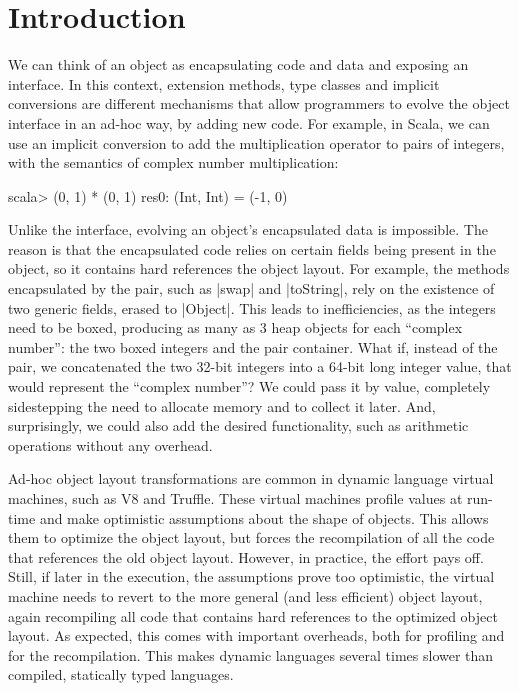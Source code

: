 \section{Introduction}
\label{sec:intro}

We can think of an object as encapsulating code and data and exposing an interface. In this context, extension methods, type classes and implicit conversions are different mechanisms that allow programmers to evolve the object interface in an ad-hoc way, by adding new code. For example, in Scala, we can use an implicit conversion to add the multiplication operator to pairs of integers, with the semantics of complex number multiplication:

\begin{lstlisting-nobreak}
scala> (0, 1) * (0, 1)
res0: (Int, Int) = (-1, 0)
\end{lstlisting-nobreak}

Unlike the interface, evolving an object's encapsulated data is impossible. The reason is that the encapsulated code relies on certain fields being present in the object, so it contains hard references the object layout. For example, the methods encapsulated by the pair, such as |swap| and |toString|, rely on the existence of two generic fields, erased to |Object|. This leads to inefficiencies, as the integers need to be boxed, producing as many as 3 heap objects for each ``complex number'': the two boxed integers and the pair container. What if, instead of the pair, we concatenated the two 32-bit integers into a 64-bit long integer value, that would represent the ``complex number''? We could pass it by value, completely sidestepping the need to allocate memory and to collect it later. And, surprisingly, we could also add the desired functionality, such as arithmetic operations without any overhead.

Ad-hoc object layout transformations are common in dynamic language virtual machines, such as V8 and Truffle. These virtual machines profile values at run-time and make optimistic assumptions about the shape of objects. This allows them to optimize the object layout, but forces the recompilation of all the code that references the old object layout. However, in practice, the effort pays off. Still, if later in the execution, the assumptions prove too optimistic, the virtual machine needs to revert to the more general (and less efficient) object layout, again recompiling all code that contains hard references to the optimized object layout. As expected, this comes with important overheads, both for profiling and for the recompilation. This makes dynamic languages several times slower than compiled, statically typed languages.

